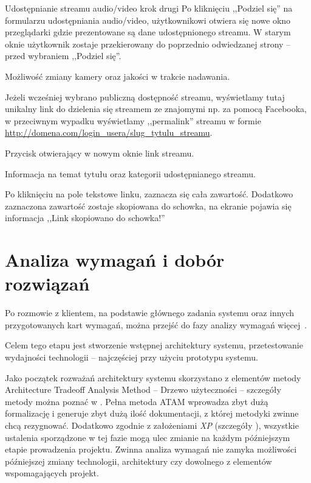 \begin{userstory}{Udostępnianie streamu audio/video krok drugi}
    Po kliknięciu ,,Podziel się'' na formularzu udostępniania audio/video, użytkownikowi otwiera się nowe okno przeglądarki gdzie prezentowane są dane udostępnionego streamu. W starym oknie użytkownik zostaje przekierowany do poprzednio odwiedzanej strony -- przed wybraniem ,,Podziel się''.
    \begin{packed_enum}
        \item{Możliwość zmiany kamery oraz jakości w trakcie nadawania.}
        \item{Jeżeli wcześniej wybrano publiczną dostępność streamu, wyświetlamy tutaj unikalny link do dzielenia się streamem ze znajomymi np. za pomocą Facebooka, w przeciwnym wypadku wyświetlamy ,,permalink'' streamu w formie \url{http://domena.com/login_usera/slug_tytulu_streamu}.}
        \item{Przycisk otwierający w nowym oknie link streamu.}
        \item{Informacja na temat tytułu oraz kategorii udostępnianego streamu.}
    \end{packed_enum}
    \begin{tests}
        \item{Po kliknięciu na pole tekstowe linku, zaznacza się cała zawartość. Dodatkowo zaznaczona zawartość zostaje skopiowana do schowka, na ekranie pojawia się informacja ,,Link skopiowano do schowka!''}
    \end{tests}
\end{userstory}

\section{Analiza wymagań i dobór rozwiązań}
\label{sec:EtapIaw}

Po rozmowie z klientem, na podstawie głównego zadania systemu oraz innych przygotowanych kart wymagań, można przejść do fazy analizy wymagań więcej~.

Celem tego etapu jest stworzenie wstępnej architektury systemu, przetestowanie wydajności technologii -- najczęściej przy użyciu prototypu systemu.

Jako początek rozważań architektury systemu skorzystano z elementów metody Architecture Tradeoff Analysis Method -- Drzewo użyteczności -- szczegóły metody można poznać w \cite{Kaz2000}. Pełna metoda ATAM wprowadza zbyt dużą formalizację i generuje zbyt dużą ilość dokumentacji, z której metodyki zwinne chcą rezygnować. Dodatkowo zgodnie z założeniami \textit{XP} (szczegóły ), wszystkie ustalenia sporządzone w tej fazie mogą ulec zmianie na każdym późniejszym etapie prowadzenia projektu. Zwinna analiza wymagań nie zamyka możliwości późniejszej zmiany technologii, architektury czy dowolnego z elementów wspomagających projekt.

